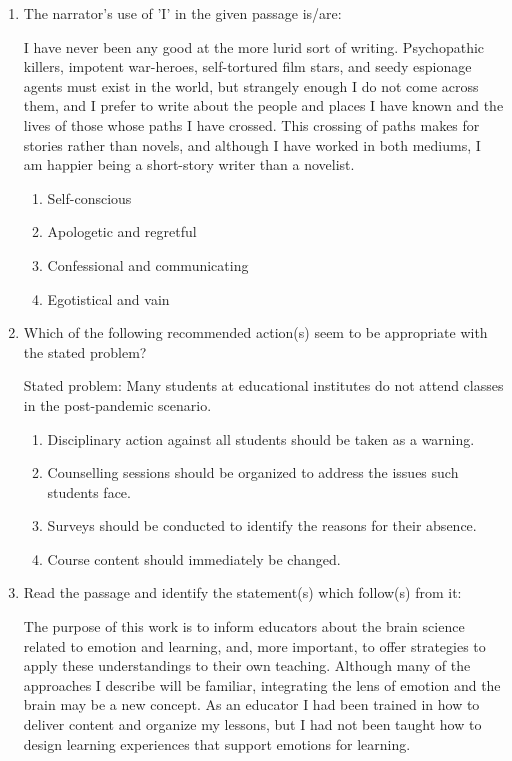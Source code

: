 \documentclass[journal,12pt,onecolumn]{exam}
\theoremstyle{remark}
\begin{document}
\begin{enumerate}
\item The narrator's use of 'I' in the given passage is/are:

I have never been any good at the more lurid sort of writing. Psychopathic killers, impotent war-heroes, self-tortured film stars, and seedy espionage agents must exist in the world, but strangely enough I do not come across them, and I prefer to write about the people and places I have known and the lives of those whose paths I have crossed. This crossing of paths makes for stories rather than novels, and although I have worked in both mediums, I am happier being a short-story writer than a novelist.

\begin{enumerate}[label=(\Alph*)]
    \item Self-conscious
    \item Apologetic and regretful
    \item Confessional and communicating
    \item Egotistical and vain
\end{enumerate}

\item Which of the following recommended action(s) seem to be appropriate with the stated problem?

  Stated problem: Many students at educational institutes do not attend classes in the post-pandemic scenario.

  \begin{enumerate}[label=(\Alph*)]
    \item Disciplinary action against all students should be taken as a warning.
    \item Counselling sessions should be organized to address the issues such students face.
    \item Surveys should be conducted to identify the reasons for their absence.
    \item Course content should immediately be changed.
  \end{enumerate}

  \item Read the passage and identify the statement(s) which follow(s) from it:

  The purpose of this work is to inform educators about the brain science related to emotion and learning, and, more important, to offer strategies to apply these understandings to their own teaching. Although many of the approaches I describe will be familiar, integrating the lens of emotion and the brain may be a new concept. As an educator I had been trained in how to deliver content and organize my lessons, but I had not been taught how to design learning experiences that support emotions for learning.


\end{enumerate}
\end{document}
